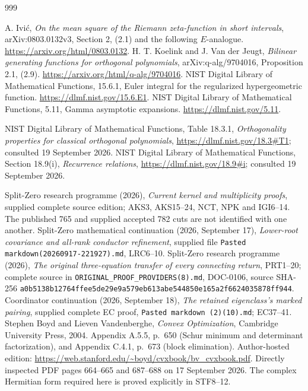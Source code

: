 \documentclass[11pt,a4paper]{article}
\begin{document}
\endgroup

\endgroup

\clearpage
\begin{thebibliography}{999}

 A. Ivi\'c,
\emph{On the mean square of the Riemann zeta-function in short intervals},
arXiv:0803.0132v3, Section 2, (2.1) and the following \(E\)-analogue.
\url{https://arxiv.org/html/0803.0132}.
 H. T. Koelink and J. Van der Jeugt,
\emph{Bilinear generating functions for orthogonal polynomials},
arXiv:q-alg/9704016, Proposition 2.1, (2.9).
\url{https://arxiv.org/html/q-alg/9704016}.
 NIST Digital Library of Mathematical Functions,
15.6.1, Euler integral for the regularized hypergeometric function.
\url{https://dlmf.nist.gov/15.6.E1}.
 NIST Digital Library of Mathematical Functions,
5.11, Gamma asymptotic expansions.
\url{https://dlmf.nist.gov/5.11}.

NIST Digital Library of Mathematical Functions, Table 18.3.1,
\textit{Orthogonality properties for classical orthogonal polynomials},
\url{https://dlmf.nist.gov/18.3#T1}; consulted 19 September 2026.
NIST Digital Library of Mathematical Functions, Section 18.9(i),
\textit{Recurrence relations},
\url{https://dlmf.nist.gov/18.9#i}; consulted 19 September 2026.

 Split-Zero research programme (2026), \emph{Current kernel and multiplicity proofs}, supplied complete source edition; AKS3, AKS15--24, NCT, NPK and IGI6--14. The published 765 and supplied accepted 782 cuts are not identified with one another.
 Split-Zero mathematical continuation (2026, September 17), \emph{Lower-root covariance and all-rank conductor refinement}, supplied file \texttt{Pasted markdown(20260917-221927).md}, LRC6--10.
 Split-Zero research programme (2026), \emph{The original three-equation transfer of every connecting return}, PRT1--20; complete source in \texttt{ORIGINAL\_PROOF\_PROVIDERS(8).md}, DOC-0106, source SHA-256 \texttt{a0b5138b12764ffee5de29e9a579eb613abe544850e165a2f6624035878ff944}.
 Coordinator continuation (2026, September 18), \emph{The retained eigenclass's marked pairing}, supplied complete EC proof, \texttt{Pasted markdown (2)(10).md}; EC37--41.
Stephen Boyd and Lieven Vandenberghe,
\emph{Convex Optimization}, Cambridge University Press, 2004.
Appendix A.5.5, p.~650 (Schur minimum and determinant factorization),
and Appendix C.4.1, p.~673 (block elimination).
Author-hosted edition: \url{https://web.stanford.edu/~boyd/cvxbook/bv_cvxbook.pdf}.
Directly inspected PDF pages 664--665 and 687--688 on 17 September 2026.
The complex Hermitian form required here is proved explicitly in STF8--12.


\end{thebibliography}
\end{document}
